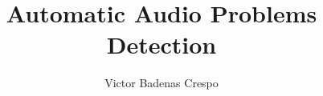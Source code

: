 \documentclass[a4paper,12pt,twoside]{report}
\begin{document}

\title{Automatic Audio Problems Detection}
\author{Victor Badenas Crespo}

\maketitle

\maketitle
\restoregeometry

\preface
\cleardoublepage 



\body







\listoffigures
\newpage
\listoftables




% 
\end{document}
